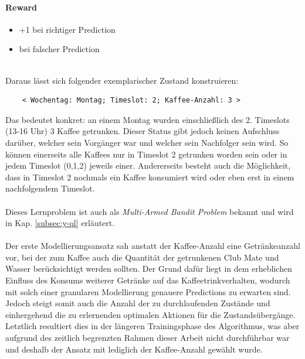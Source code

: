 \paragraph{Reward}
\begin{itemize}
	\item +1 bei richtiger Prediction
	\item {} bei falscher Prediction
\end{itemize}
\ \\
Daraus lässt sich folgender exemplarischer Zustand konstruieren: 
\begingroup
\makeatletter
\@totalleftmargin=-0.5cm
\begin{Verbatim}
	< Wochentag: Montag; Timeslot: 2; Kaffee-Anzahl: 3 >
\end{Verbatim}
\endgroup
Das bedeutet konkret: an einem Montag wurden einschließlich des 2. Timeslots (13-16 Uhr) 3 Kaffee getrunken. Dieser Status gibt jedoch keinen Aufschluss darüber, welcher sein Vorgänger war und welcher sein Nachfolger sein wird. So können einerseits alle Kaffees nur in Timeslot 2 getrunken worden sein oder in jedem Timeslot (0,1,2) jeweils einer. Andererseits besteht auch die Möglichkeit, dass in Timeslot 2 nochmals ein Kaffee konsumiert wird oder eben erst in einem nachfolgendem Timeslot.\\\\
Dieses Lernproblem ist auch als \textit{Multi-Armed Bandit Problem} bekannt und wird in Kap. \ref{subsec:y-ql} erläutert.
\\\\
Der erste Modellierungsansatz sah anstatt der Kaffee-Anzahl eine Getränkeanzahl vor, bei der zum Kaffee auch die Quantität der getrunkenen Club Mate und Wasser berücksichtigt werden sollten. Der Grund dafür liegt in dem erheblichen Einfluss des Konsums weiterer Getränke auf das Kaffeetrinkverhalten, wodurch mit solch einer granularen Modellierung genauere Predictions zu erwarten sind. Jedoch steigt somit auch die Anzahl der zu durchlaufenden Zustände und einhergehend die zu erlernenden optimalen Aktionen für die Zustandsübergänge. Letztlich resultiert dies in der längeren Trainingsphase des Algorithmus, was aber aufgrund des zeitlich begrenzten Rahmen dieser Arbeit nicht durchführbar war und deshalb der Ansatz mit lediglich der Kaffee-Anzahl gewählt wurde.

